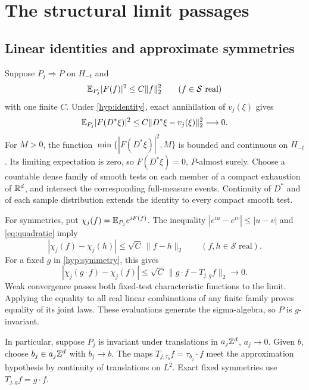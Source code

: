 \section{The structural limit passages}\label{sec:stability}

\subsection{Linear identities and approximate symmetries}
Suppose \(P_j\Rightarrow P\) on \(H_{-t}\) and
\begin{equation}\label{eq:quadratic}
 \mathbb E_{P_j}|F(f)|^2\le C\|f\|_2^2
 \qquad(f\in\mathcal S\text{ real})
\end{equation}
with one finite \(C\).
Under \cref{hyp:identity}, exact annihilation of \(v_j(\xi)\) gives
\begin{equation}\label{eq:identity-residual}
 \mathbb E_{P_j}|F(D^*\xi)|^2
 \le C\|D^*\xi-v_j(\xi)\|_2^2\longrightarrow0.
\end{equation}
For \(M>0\), the function
\(\min\{|F(D^*\xi)|^2,M\}\) is bounded and continuous on \(H_{-t}\).
Its limiting expectation is zero, so \(F(D^*\xi)=0\),
\(P\)-almost surely. Choose a countable dense family of smooth tests
on each member of a compact exhaustion of \(\mathbb R^d\), and intersect
the corresponding full-measure events. Continuity of \(D^*\) and
of each sample distribution extends the identity to every compact
smooth test.

For symmetries, put \(\chi_j(f)=\mathbb E_{P_j}e^{iF(f)}\).
The inequality \(|e^{iu}-e^{iv}|\le|u-v|\) and
\eqref{eq:quadratic} imply
\begin{equation}\label{eq:character-continuity}
 |\chi_j(f)-\chi_j(h)|\le\sqrt C\,\|f-h\|_2
 \qquad(f,h\in\mathcal S\text{ real}).
\end{equation}
For a fixed \(g\) in \cref{hyp:symmetry}, this gives
\[
 |\chi_j(g\cdot f)-\chi_j(f)|
 \le\sqrt C\,\|g\cdot f-T_{j,g}f\|_2\longrightarrow0.
\]
Weak convergence passes both fixed-test characteristic functions
to the limit. Applying the equality to all real linear combinations
of any finite family proves equality of its joint laws.
These evaluations generate the sigma-algebra, so \(P\) is
\(g\)-invariant.

In particular, suppose \(P_j\) is invariant under translations in
\(a_j\mathbb Z^d\), \(a_j\to0\). Given \(b\), choose \(b_j\in a_j\mathbb Z^d\)
with \(b_j\to b\). The maps
\(T_{j,\tau_b}f=\tau_{b_j}\cdot f\) meet the approximation
hypothesis by continuity of translations on \(L^2\).
Exact fixed symmetries use \(T_{j,g}f=g\cdot f\).

